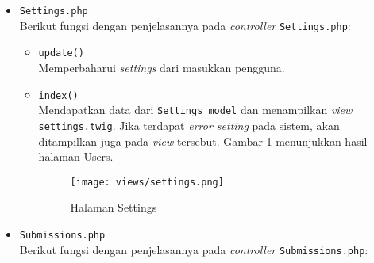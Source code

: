\begin{itemize}
      \item \verb|Settings.php| \\
            Berikut fungsi dengan penjelasannya pada \textit{controller} \verb|Settings.php|:

            \begin{itemize}
                  \item \verb|update()| \\
                        Memperbaharui \textit{settings} dari masukkan pengguna.
                  \item \verb|index()| \\
                        Mendapatkan data dari \verb|Settings_model| dan menampilkan \textit{view} \verb|settings.twig|. Jika terdapat \textit{error setting} pada sistem, akan ditampilkan juga pada \textit{view} tersebut. Gambar \ref{fig:3:1:1:settings} menunjukkan hasil halaman Users.

                        \begin{figure}[H]
                              \centering
                              \texttt{[image: views/settings.png]}
                              \caption{Halaman Settings}
                              \label{fig:3:1:1:settings}
                        \end{figure}

            \end{itemize}

      \item \verb|Submissions.php| \\
            Berikut fungsi dengan penjelasannya pada \textit{controller} \verb|Submissions.php|:


\end{itemize}
